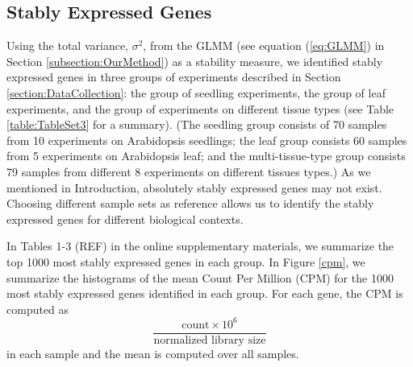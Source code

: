 \documentclass[11pt, a4paper]{article}
\begin{document}
\subsection{Stably Expressed Genes}\label{section:stablyExpressedGene}
Using the total variance, $\sigma^2$, from the GLMM (see
equation (\ref{eq:GLMM}) in Section \ref{subsection:OurMethod}) as a
stability measure, we identified stably expressed genes in three groups of
experiments described in Section \ref{section:DataCollection}: the group of seedling
experiments, the group of leaf experiments, and the group of experiments on
different tissue types (see Table \ref{table:TableSet3} for a summary).  (The
seedling group consists of 70 samples from 10 experiments on Arabidopsis
seedlings; the leaf group consists 60 samples from 5 experiments on
Arabidopsis leaf; and the multi-tissue-type group consists 79 samples from
different 8 experiments on different tissues types.) As we mentioned in
Introduction, absolutely stably expressed genes may not exist.  Choosing
different sample sets as reference allows us to identify the stably expressed
genes for different biological contexts.

In Tables 1-3 (REF) in the online supplementary materials, we summarize the
top 1000 most stably expressed genes in each group.  In Figure \ref{cpm}, we
summarize the histograms of the mean Count Per Million (CPM) for the 1000
most stably expressed genes identified in each group. For each gene, the CPM
is computed as \[ \dfrac{ \text{count} \times 10^6 }{ \text{normalized library
size}} \] in each sample and the mean is computed over all samples.
 
\end{document}

